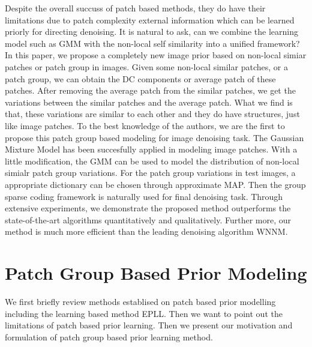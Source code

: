 \documentclass[10pt,twocolumn,letterpaper]{article}
\begin{document}
Despite the overall succuss of patch based methods, they do have their limitations due to patch complexity\cite{levin2012patch} external information which can be learned priorly for directing denoising. It is natural to ask, can we combine the learning model such as GMM with the non-local self similarity into a unified framework? In this paper, we propose a completely new image prior based on non-local simiar patches or patch group in images. Given some non-local similar patches, or a patch group, we can obtain the DC components or average patch of these patches. After removing the average patch from the similar patches, we get the variations between the similar patches and the average patch. What we find is that, these variations are similar to each other and they do have structures, just like image patches. To the best knowledge of the authors, we are the first to propose this patch group based modeling for image denoising task. The Gaussian Mixture Model has been succesfully applied in modeling image patches. With a little modification, the GMM can be used to model the distribution of non-local simialr patch group variations. For the patch group variations in test images, a appropriate dictionary can be chosen through approximate MAP. Then the group sparse coding framework is naturally used for final denoising task. Through extensive experiments, we demonstrate the proposed method outperforms the state-of-the-art algorithms quantitatively and qualitatively. Further more, our method is much more efficient than the leading denoising algorithm WNNM.
\section{Patch Group Based Prior Modeling}
We first briefly review methods establised on patch based prior modelling including the learning based method EPLL\cite{epll}. Then we want to point out the limitations of patch based prior learning. Then we present our motivation and formulation of patch group based prior learning method.
\end{document}

